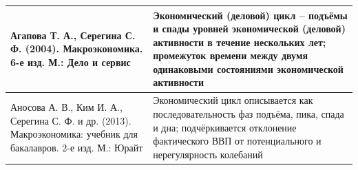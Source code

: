 \begin{longtable}{
    |>{\RaggedRight\arraybackslash}p{}
    |p{}|
    }
    Агапова Т. А., Серегина С. Ф. (2004). Макроэкономика. 6-е изд. М.: Дело и сервис\cite{Агапова-2004}
    &
    Экономический (деловой) цикл – подъёмы и спады уровней экономической (деловой) активности в течение нескольких лет; промежуток времени между двумя одинаковыми состояниями экономической активности \\ \hline

    Аносова А. В., Ким И. А., Серегина С. Ф. и др. (2013). Макроэкономика: учебник для бакалавров. 2-е изд. М.: Юрайт\cite{Аносова-2013}
    &
    Экономический цикл описывается как последовательность фаз подъёма, пика, спада и дна; подчёркивается отклонение фактического ВВП от потенциального и нерегулярность колебаний \\ \hline
\end{longtable}